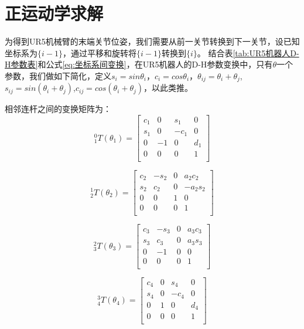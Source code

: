 \documentclass{seuthesis-2022}
\numberwithin{equation}{section}
\begin{document}
\section{正运动学求解}\label{正运动学}
为得到UR5机械臂的末端关节位姿，我们需要从前一关节转换到下一关节，设已知坐标系为$\{i-1\}$，通过平移和旋转将$\{i-1\}$转换到$\{i\}$。
结合表\ref{tab:UR5机器人D-H参数表}和公式\eqref{eq:坐标系间变换}，在UR5机器人的D-H参数变换中，只有$\theta$一个参数，我们做如下简化，定义$s_i=sin\theta_i$，$c_i=cos\theta_i$，$\theta_{ij} = \theta_i + \theta_j$,
$s_{ij} = sin(\theta_i+\theta_j)$,$c_{ij} = cos(\theta_i+\theta_j)$，以此类推。

相邻连杆之间的变换矩阵为：
\begin{equation}
  ^0_1T(\theta_1)=
  \begin{bmatrix}
    c_1 & 0 & s_1 & 0\\
    s_1 & 0 & -c_1 & 0\\
    0 & -1 & 0 & d_1\\
    0 & 0 & 0 & 1\\
  \end{bmatrix}
  \label{eq:^0_1T}
\end{equation}

\begin{equation}
  ^1_2T(\theta_2)=
  \begin{bmatrix}
    c_2 & -s_2 & 0 & a_2c_2\\
    s_2 & c_2 & 0 & -a_2s_2\\
    0 & 0 & 1 & 0\\
    0 & 0 & 0 & 1\\
  \end{bmatrix}
  \label{eq:^1_2T}
\end{equation}

\begin{equation}
  ^2_3T(\theta_3)=
  \begin{bmatrix}
    c_3 & -s_3 & 0 & a_3c_3\\
    s_3 & c_3 & 0 & a_3s_3\\
    0 & -1 & 0 & 0\\
    0 & 0 & 0 & 1\\
  \end{bmatrix}
  \label{eq:^2_3T}
\end{equation}

\begin{equation}
  ^3_4T(\theta_4)=
  \begin{bmatrix}
    c_4 & 0 & s_4 & 0\\
    s_4 & 0 & -c_4 & 0\\
    0 & 1 & 0 & d_4\\
    0 & 0 & 0 & 1\\
  \end{bmatrix}
  \label{eq:^3_4T}
\end{equation}
\end{document}
